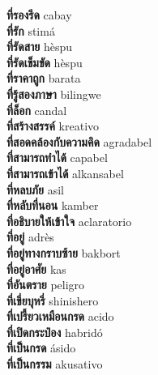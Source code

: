 \textbf{ ที่รองรีด  } cabay \\
\textbf{ ที่รัก  } stimá \\
\textbf{ ที่รัดสาย  } hèspu \\
\textbf{ ที่รัดเข็มขัด  } hèspu \\
\textbf{ ที่ราคาถูก  } barata \\
\textbf{ ที่รู้สองภาษา  } bilingwe \\
\textbf{ ที่ล็อก  } candal \\
\textbf{ ที่สร้างสรรค์  } kreativo \\
\textbf{ ที่สอดคล้องกับความคิด  } agradabel \\
\textbf{ ที่สามารถทำได้  } capabel \\
\textbf{ ที่สามารถเข้าได้  } alkansabel \\
\textbf{ ที่หลบภัย  } asil \\
\textbf{ ที่หลับที่นอน  } kamber \\
\textbf{ ที่อธิบายให้เข้าใจ  } aclaratorio \\
\textbf{ ที่อยู่  } adrès \\
\textbf{ ที่อยู่ทางกราบซ้าย  } bakbort \\
\textbf{ ที่อยู่อาศัย  } kas \\
\textbf{ ที่อันตราย  } peligro \\
\textbf{ ที่เขี่ยบุหรี่  } shinishero \\
\textbf{ ที่เปรี้ยวเหมือนกรด  } acido \\
\textbf{ ที่เปิดกระป๋อง  } habridó \\
\textbf{ ที่เป็นกรด  } ásido \\
\textbf{ ที่เป็นกรรม  } akusativo \\
